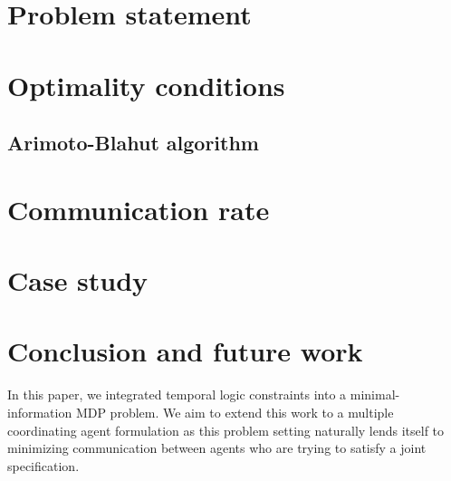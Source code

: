 \documentclass[letterpaper, 10 pt, conference]{ieeeconf}  %
\begin{document}
 






\section{Problem statement}








\section{Optimality conditions}



\subsection{Arimoto-Blahut algorithm}


\section{Communication rate}\label{sec:ab}



\section{Case study}


\section{Conclusion and future work}
In this paper, we integrated temporal logic constraints into a minimal-information MDP problem. We aim to extend this work to a multiple coordinating agent formulation as this problem setting naturally lends itself to minimizing communication between agents who are trying to satisfy a joint specification. 



\end{document}
